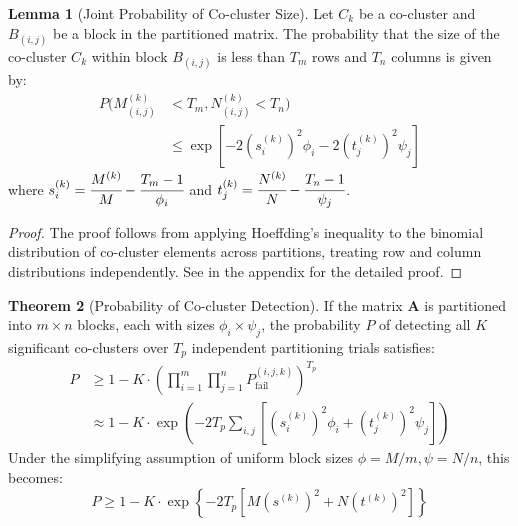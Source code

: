 \documentclass[journal]{IEEEtran}
\theoremstyle{definition}
\newtheorem{theorem}{Theorem}
\newtheorem{lemma}[theorem]{Lemma}
\theoremstyle{remark} %
\begin{document}
\begin{lemma}[Joint Probability of Co-cluster Size]
    \label{thm:joint-probability}
    Let $C_k$ be a co-cluster and $B_{(i,j)}$ be a block in the partitioned matrix. The probability that the size of the co-cluster $C_k$ within block $B_{(i,j)}$ is less than $T_m$ rows and $T_n$ columns is given by:
    \begin{equation}
        \begin{aligned}
            P(M_{(i,j)}^{(k)} & < T_m, N_{(i,j)}^{(k)} < T_n)                                         \\
                              & \leq \exp\left[-2 (s_i^{(k)})^2 \phi_i -2 (t_j^{(k)})^2 \psi_j\right]
        \end{aligned}
        \label{eq:joint-probability}
    \end{equation}
    where $s_i^{(k)} = \cfrac{M^{(k)}}{M} - \cfrac{T_m-1}{\phi_i}$ and $t_j^{(k)} = \cfrac{N^{(k)}}{N} - \cfrac{T_n-1}{\psi_j}$.
\end{lemma}

{\color{blue}
\begin{proof}
    The proof follows from applying Hoeffding's inequality to the binomial distribution of co-cluster elements across partitions, treating row and column distributions independently. See  in the appendix for the detailed proof.
\end{proof}
}

\begin{theorem}[Probability of Co-cluster Detection]
    \label{thm:probability-co-cluster-detection}
    If the matrix $\mathbf{A}$ is partitioned into $m \times n$ blocks, each with sizes $\phi_i \times \psi_j$, the probability $P$ of detecting all $K$ significant co-clusters over $T_p$ independent partitioning trials satisfies:
    \begin{equation}
        \begin{aligned}
            P & \geq 1 - K \cdot \left(\prod_{i=1}^m \prod_{j=1}^n P_\text{fail}^{(i,j,k)}\right)^{T_p}                             \\
              & \approx 1 - K \cdot \exp\left( -2 T_p \sum_{i,j} \left[ (s_i^{(k)})^2 \phi_i + (t_j^{(k)})^2 \psi_j \right] \right)
        \end{aligned}
    \end{equation}
    Under the simplifying assumption of uniform block sizes $\phi = M/m, \psi=N/n$, this becomes:
    \begin{equation}
        P \geq 1 - K \cdot \exp \left\{ -2 T_p \left[ M (s^{(k)})^2 + N (t^{(k)})^2 \right] \right\}
        \label{eq:prob-of-identifying-all-co-clusters}
    \end{equation}
\end{theorem}
\end{document}
